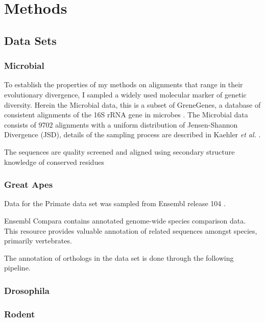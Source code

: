 \chapter{Methods}

\section{Data Sets}
\subsection{Microbial}

To establish the properties of my methods on alignments that range in their evolutionary divergence, I sampled a widely used molecular marker of genetic diversity. Herein the Microbial data, this is a subset of GreneGenes, a database of consistent alignments of the 16S rRNA gene in microbes \cite{McDonald2012AnArchaeab}. The Microbial data consists of 9702 alignments with a uniform distribution of Jensen-Shannon Divergence (JSD), details of the sampling process are described in Kaehler \textit{et al.} \cite{Kaehler2015}. 


 The sequences are quality screened and aligned using secondary structure knowledge of conserved residues \cite{McDonald2012AnArchaea}


\subsection{Great Apes}


Data for the Primate data set was sampled from Ensembl release 104 \cite{Howe2021Ensembl2021}. 

Ensembl Compara \cite{Howe2021Ensembl2021} contains annotated genome-wide species comparison data. This resource provides valuable annotation of related sequences amongst species, primarily vertebrates. 


The annotation of orthologs in the data set is done through the following pipeline. 



\subsection{Drosophila}


\subsection{Rodent}


